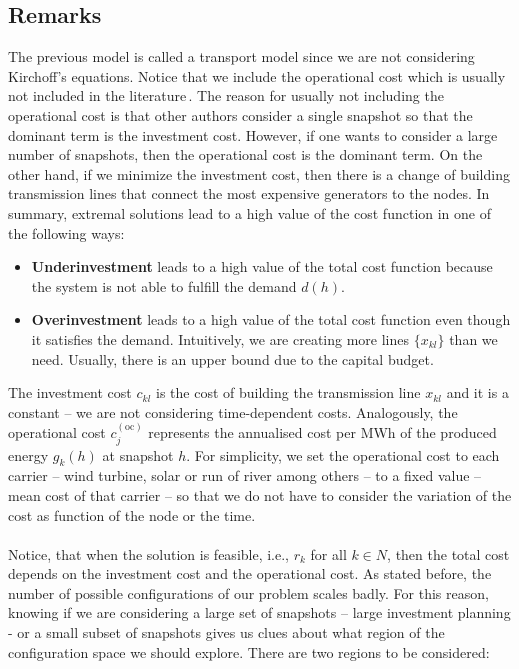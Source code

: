 \subsection{Remarks}
The previous model is called a transport model since we are not considering Kirchoff's equations. Notice that we include the operational cost which is usually not included in the literature\,\cite{Gomes2019}. The reason for usually not including the operational cost is that other authors consider a single snapshot so that the dominant term is the investment cost. However, if one wants to consider a large number of snapshots, then the operational cost is the dominant term. On the other hand, if we minimize the investment cost, then there is a change of building transmission lines that connect the most expensive generators to the nodes. In summary, extremal solutions lead to a high value of the cost function in one of the following ways:
\begin{itemize}
    \item \textbf{Underinvestment} leads to a high value of the total cost function because the system is not able to fulfill the demand $d(h)$.
    \item \textbf{Overinvestment} leads to a high value of the total cost function even though it satisfies the demand. Intuitively, we are creating more lines $\{x_{kl}\}$ than we need. Usually, there is an upper bound due to the capital budget.
\end{itemize}
The investment cost $c_{kl}$ is the cost of building the transmission line $x_{kl}$ and it is a constant -- we are not considering time-dependent costs. Analogously, the operational cost $c_{j}^{(\text{oc})}$ represents the annualised cost per MWh of the produced energy $g_{k}(h)$ at snapshot $h$. For simplicity, we set the operational cost to each carrier -- wind turbine, solar or run of river among others -- to a fixed value -- mean cost of that carrier -- so that we do not have to consider the variation of the cost as function of the node or the time.\\\\
Notice, that when the solution is feasible, i.e., $r_k$ for all $k\in N$, then the total cost depends on the investment cost and the operational cost. As stated before, the number of possible configurations of our problem scales badly. For this reason, knowing if we are considering a large set of snapshots -- large investment planning - or a small subset of snapshots gives us clues about what region of the configuration space we should explore. There are two regions to be considered:
